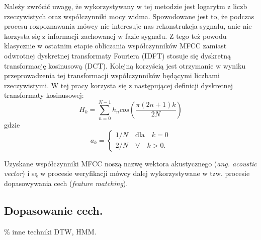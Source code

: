 Należy zwrócić uwagę, że wykorzystywany w tej metodzie jest logarytm z liczb rzeczywistych oraz współczynniki mocy widma. Spowodowane jest to, że podczas procesu rozpoznawania mówcy nie interesuje nas rekonstrukcja sygnału, anie nie korzysta się z informacji zachowanej w fazie sygnału. Z tego też powodu klasycznie w ostatnim etapie obliczania współczynników MFCC zamiast odwrotnej dyskretnej transformaty Fouriera (IDFT) stosuje się dyskretną transformację kosinusową (DCT). Kolejną korzyścią jest otrzymanie w wyniku przeprowadzenia tej transformacji współczynników będącymi liczbami rzeczywistymi. W tej pracy korzysta się z następującej definicji dyskretnej transformaty kosinusowej:
\begin{equation}
    H_k = \sum_{n=0}^{N-1} h_ncos\left(\frac{\pi (2n+1)k}{2N}\right)
\end{equation}
gdzie
\begin{equation}
    a_k = 
    \begin{cases}
        1/N \quad \text{dla}\quad k=0 \\
        2/N \quad \forall \quad k>0.
    \end{cases}
\end{equation}

Uzyskane współczynniki MFCC noszą nazwę wektora akustycznego (\textit{ang. acoustic vector}) i są w procesie weryfikacji mówcy dalej wykorzystywane w tzw. procesie dopasowywania cech (\textit{feature matching}).

\subsection{Dopasowanie cech.}

\% inne techniki DTW, HMM.

